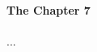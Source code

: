 \documentclass[12pt,usletter, fancy]{elegantbook}
\begin{document}
\paragraph*{The Chapter 7}...

% 
% 
% 
% 
\end{document}
